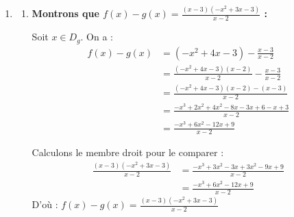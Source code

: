 \documentclass[10pt, a4paper]{article}
\begin{document}
\begin{Solution}
\begin{enumerate}[leftmargin=*,itemsep=0.5pt]
\begin{enumerate}[leftmargin=*,itemsep=0.5pt]
        Donc : \quad $\Delta = \begin{vmatrix} 1 & -3 \\ 1 & -2 \end{vmatrix} = 1 \times (-2) - (-3) \times 1 = -2 + 3 = 1 $

        Puisque $\Delta > 0$, $g$ est \textbf{strictement croissante} sur chacun des intervalles $\big]-\infty\,;\,2\big[$ et sur $\big]2\,;\,+\infty\big[$.

        \begin{center}
        \end{center}

        \item \textbf{Nature de $(C_g)$ :}

        $(C_g)$ est une \textbf{hyperbole} de centre $\Omega(2\,;\,1)$, d'asymptotes : $x = 2$ (verticale) et $y = 1$ (horizontale).
    \end{enumerate}

    \item
    \begin{enumerate}[leftmargin=*,itemsep=0.5pt]
        \item \textbf{Montrons que $f(x) - g(x) = \frac{(x-3)(-x^2+3x-3)}{x-2}$ :}

        Soit $x \in D_g$. On a :
\begin{align*}
    f(x) - g(x) &= (-x^2 + 4x - 3) - \frac{x-3}{x-2} \\
    &= \frac{(-x^2 + 4x - 3)(x-2)}{x-2} - \frac{x-3}{x-2} \\
    &= \frac{(-x^2 + 4x - 3)(x-2) - (x-3)}{x-2} \\
    &= \frac{-x^3 + 2x^2 + 4x^2 - 8x - 3x + 6 - x + 3}{x-2} \\
    &= \frac{-x^3 + 6x^2 - 12x + 9}{x-2}
\end{align*}

Calculons le membre droit pour le comparer :
\begin{align*}
    \frac{(x-3)(-x^2+3x-3)}{x-2} &= \frac{-x^3 + 3x^2 - 3x + 3x^2 - 9x + 9}{x-2} \\
    &= \frac{-x^3 + 6x^2 - 12x + 9}{x-2}
\end{align*}
        D'où : \quad $f(x) - g(x) = \frac{(x-3)(-x^2+3x-3)}{x-2}$


\end{enumerate}
\end{enumerate}
\end{Solution}
\end{document}
